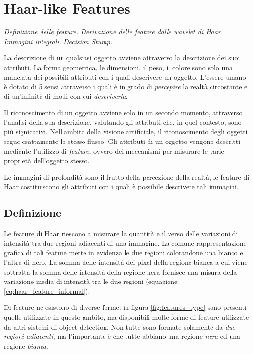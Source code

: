 
\chapter{Haar-like Features}
\label{cap:haar_features}
\emph{Definizione delle feature.
Derivazione delle feature dalle wavelet di Haar.
Immagini integrali.
Decision Stump.} 


La descrizione di un qualsiasi oggetto avviene attraverso la descrizione dei suoi attributi. La forma geometrica, le dimensioni, il peso, il colore sono solo una manciata dei possibili attributi con i quali descrivere un oggetto.
L'essere umano è dotato di 5 sensi attraverso i quali è in grado di \emph{percepire} la realtà circostante e di un'infinità di modi con cui \emph{descriverla}.

Il riconoscimento di un oggetto avviene solo in un secondo momento, attraverso l'analisi della sua descrizione, valutando gli attributi che, in quel contesto, sono più signicativi.
Nell'ambito della visione artificiale, il riconoscimento degli oggetti segue esattamente lo stesso flusso.
Gli attributi di un oggetto vengono descritti mediante l'utilizzo di \emph{feature}, ovvero dei meccanismi per misurare le varie proprietà dell'oggetto stesso.

Le immagini di profondità sono il frutto della percezione della realtà, le feature di Haar costituiscono gli attributi con i quali è possibile descrivere tali immagini.


\section{Definizione}
\label{sec:haar_def}
Le feature di Haar riescono a misurare la quantità e il verso delle variazioni di intensità tra due regioni adiacenti di una immagine.
La comune rappresentazione grafica di tali feature mette in evidenza le due regioni colorandone una bianco e l'altra di nero.
La somma delle intensità dei pixel della regione bianca a cui viene sottratta la somma delle intensità della regione nera fornisce una misura della variazione media di intensità tra le due regioni (equazione \ref{eq:haar_feature_informal}).

Di feature ne esistono di diverse forme: in figura \ref{fig:features_type} sono presenti quelle utilizzate in questo ambito, ma disponibili molte forme di feature utilizzate da altri sistemi di object detection. Non tutte sono formate solamente da \emph{due regioni adiacenti}, ma l'importante è che tutte abbiano una regione \emph{nera} ed una regione \emph{bianca}.

